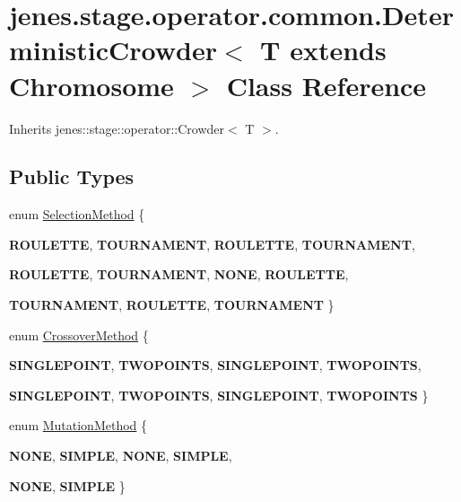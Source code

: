 \hypertarget{classjenes_1_1stage_1_1operator_1_1common_1_1_deterministic_crowder_3_01_t_01extends_01_chromosome_01_4}{
\section{jenes.stage.operator.common.DeterministicCrowder$<$ T extends Chromosome $>$ Class Reference}
\label{classjenes_1_1stage_1_1operator_1_1common_1_1_deterministic_crowder_3_01_t_01extends_01_chromosome_01_4}
}
Inherits jenes::stage::operator::Crowder$<$ T $>$.

\subsection*{Public Types}
\begin{CompactItemize}
\item 
enum \hyperlink{classjenes_1_1stage_1_1operator_1_1common_1_1_deterministic_crowder_3_01_t_01extends_01_chromosome_01_4_f734ac23216aafb25e63014b0b676e67}{SelectionMethod} \{ \par
\textbf{ROULETTE}, 
\textbf{TOURNAMENT}, 
\textbf{ROULETTE}, 
\textbf{TOURNAMENT}, 
\par
\textbf{ROULETTE}, 
\textbf{TOURNAMENT}, 
\textbf{NONE}, 
\textbf{ROULETTE}, 
\par
\textbf{TOURNAMENT}, 
\textbf{ROULETTE}, 
\textbf{TOURNAMENT}
 \}
\item 
enum \hyperlink{classjenes_1_1stage_1_1operator_1_1common_1_1_deterministic_crowder_3_01_t_01extends_01_chromosome_01_4_e58e16af4a8087c42225aa099718231d}{CrossoverMethod} \{ \par
\textbf{SINGLEPOINT}, 
\textbf{TWOPOINTS}, 
\textbf{SINGLEPOINT}, 
\textbf{TWOPOINTS}, 
\par
\textbf{SINGLEPOINT}, 
\textbf{TWOPOINTS}, 
\textbf{SINGLEPOINT}, 
\textbf{TWOPOINTS}
 \}
\item 
enum \hyperlink{classjenes_1_1stage_1_1operator_1_1common_1_1_deterministic_crowder_3_01_t_01extends_01_chromosome_01_4_40d00705655302bc78c3e60aca4c43b5}{MutationMethod} \{ \par
\textbf{NONE}, 
\textbf{SIMPLE}, 
\textbf{NONE}, 
\textbf{SIMPLE}, 
\par
\textbf{NONE}, 
\textbf{SIMPLE}
 \}
\end{CompactItemize}
